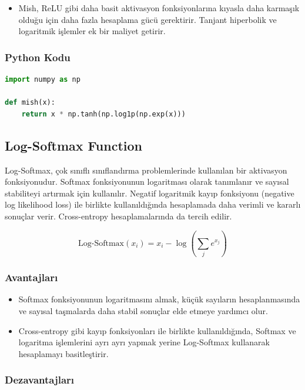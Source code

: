 \begin{itemize}
    \item Mish, ReLU gibi daha basit aktivasyon fonksiyonlarına kıyasla daha karmaşık olduğu için daha fazla hesaplama gücü gerektirir. Tanjant hiperbolik ve logaritmik işlemler ek bir maliyet getirir.
\end{itemize}

\subsubsection{Python Kodu}

\begin{lstlisting}[language=Python]
import numpy as np

def mish(x):
    return x * np.tanh(np.log1p(np.exp(x)))
\end{lstlisting}

\newpage

\subsection{Log-Softmax Function}

Log-Softmax, çok sınıflı sınıflandırma problemlerinde kullanılan bir aktivasyon fonksiyonudur. Softmax fonksiyonunun logaritması olarak tanımlanır ve sayısal stabiliteyi artırmak için kullanılır. Negatif logaritmik kayıp fonksiyonu (negative log likelihood loss) ile birlikte kullanıldığında hesaplamada daha verimli ve kararlı sonuçlar verir. Cross-entropy hesaplamalarında da tercih edilir.

\[ \text{Log-Softmax}(x_i) = x_i - \log \left( \sum_{j} e^{x_j} \right) \]

\subsubsection{Avantajları}

\begin{itemize}
    \item Softmax fonksiyonunun logaritmasını almak, küçük sayıların hesaplanmasında ve sayısal taşmalarda daha stabil sonuçlar elde etmeye yardımcı olur.
    \item Cross-entropy gibi kayıp fonksiyonları ile birlikte kullanıldığında, Softmax ve logaritma işlemlerini ayrı ayrı yapmak yerine Log-Softmax kullanarak hesaplamayı basitleştirir.
\end{itemize}

\subsubsection{Dezavantajları}

